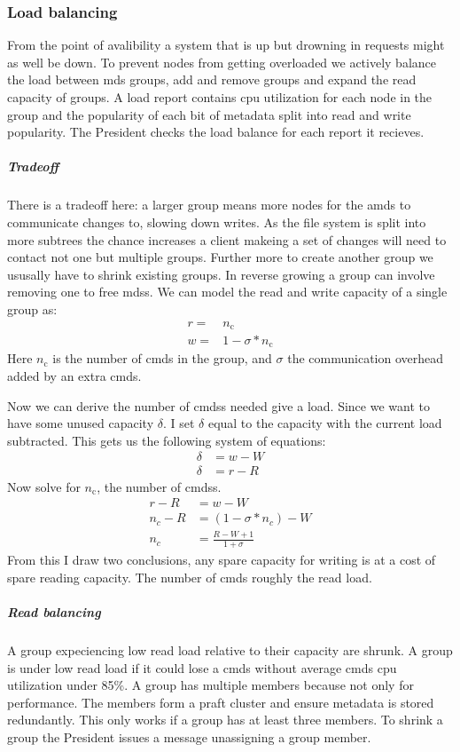 \subsubsection*{Load balancing} \label{sec:loadb}
From the point of avalibility a system that is up but drowning in requests might as well be down. To prevent nodes from getting overloaded we actively balance the load between \ac{mds} groups, add and remove groups and expand the read capacity of groups. A load report contains cpu utilization for each node in the group and the popularity of each bit of metadata split into read and write popularity. The President checks the load balance for each report it recieves.
%
\subparagraph*{Tradeoff}
There is a tradeoff here: a larger group means more nodes for the \ac{amds} to communicate changes to, slowing down writes. As the file system is split into more subtrees the chance increases a client makeing a set of changes will need to contact not one but multiple groups. Further more to create another group we ususally have to shrink existing groups. In reverse growing a group can involve removing one to free \acp{mds}. 
%
We can model the read and write capacity of a single group as:
\begin{align}
	r =& n_\text{c} \\
	w =& 1 - \sigma*n_\text{c}
\end{align}%
Here $n_\text{c}$ is the number of \ac{cmds} in the group, and $\sigma$ the communication overhead added by an extra \ac{cmds}. 

Now we can derive the number of \acp{cmds} needed give a load. Since we want to have some unused capacity $\delta$. I set $\delta$ equal to the capacity with the current load subtracted. This gets us the following system of equations: 
\begin{align}
	\delta &= w - W \\
	\delta &= r - R
\end{align}%
Now solve for $n_\text{c}$, the number of \acp{cmds}.
\begin{align}
	r - R &= w - W \\
	n_c - R &= \left(1 - \sigma*n_c\right) - W \\
	n_c &= \frac{R - W + 1}{1 + \sigma}
\end{align}
From this I draw two conclusions, any spare capacity for writing is at a cost of spare reading capacity. The number of \ac{cmds} roughly the read load.
%
%
\subparagraph*{Read balancing}
A group expeciencing low read load relative to their capacity are shrunk. A group is under low read load if it could lose a \ac{cmds} without average \ac{cmds} cpu utilization under 85\%. A group has multiple members because not only for performance. The members form a \ac{praft} cluster and ensure metadata is stored redundantly. This only works if a group has at least three members. To shrink a group the President issues a \raft{} message unassigning a group member. 

